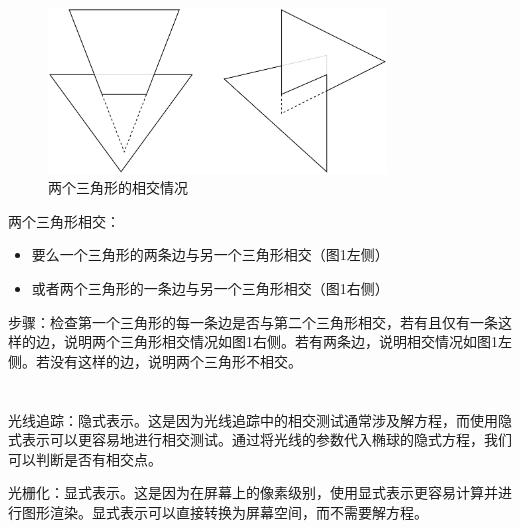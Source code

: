 \documentclass{article}
\begin{document}
\section{}

\begin{figure}
    \centering
    \includegraphics[width=0.8\textwidth]{pic/image-20231212174346327.png}
    \caption{两个三角形的相交情况}
    \label{fig:triangles}
\end{figure}

两个三角形相交：

\begin{itemize}[leftmargin=2cm]
    \item 要么一个三角形的两条边与另一个三角形相交（图1左侧）
    \item 或者两个三角形的一条边与另一个三角形相交（图1右侧）
\end{itemize}

步骤：检查第一个三角形的每一条边是否与第二个三角形相交，若有且仅有一条这样的边，说明两个三角形相交情况如图1右侧。若有两条边，说明相交情况如图1左侧。若没有这样的边，说明两个三角形不相交。

\section{}

\subsection{}

光线追踪：隐式表示。这是因为光线追踪中的相交测试通常涉及解方程，而使用隐式表示可以更容易地进行相交测试。通过将光线的参数代入椭球的隐式方程，我们可以判断是否有相交点。

光栅化：显式表示。这是因为在屏幕上的像素级别，使用显式表示更容易计算并进行图形渲染。显式表示可以直接转换为屏幕空间，而不需要解方程。

\subsection{}
\end{document}
